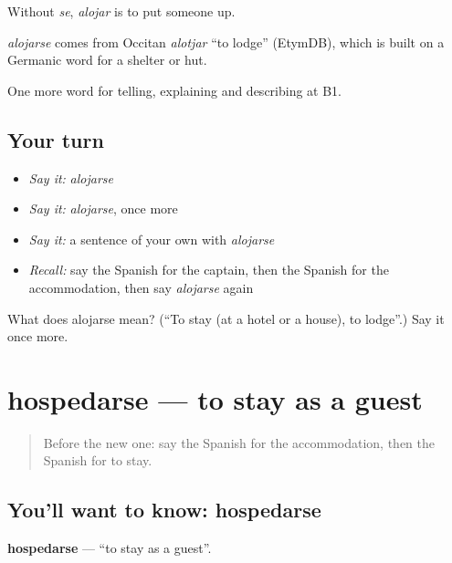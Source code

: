 Without \emph{se}, \emph{alojar} is to put someone up.

\begin{cousinweb}
\emph{alojarse} comes from Occitan \emph{alotjar} \textquotedblleft{}to lodge\textquotedblright{} (EtymDB), which is built on a Germanic word for a shelter or hut.
\end{cousinweb}

\begin{grammarlens}[title={What you've built}]
One more word for telling, explaining and describing at B1.
\end{grammarlens}

\subsection*{Your turn}
\begin{itemize}
\raggedright
  \item \emph{Say it:} \emph{alojarse}
  \item \emph{Say it:} \emph{alojarse}, once more
  \item \emph{Say it:} a sentence of your own with \emph{alojarse}
  \item \emph{Recall:} say the Spanish for the captain, then the Spanish for the accommodation, then say \emph{alojarse} again
\end{itemize}

\begin{tcolorbox}[breakable,colback=teal!4,colframe=teal!35!black,title={Before you move on}]
What does alojarse mean? (\textquotedblleft{}To stay (at a hotel or a house), to lodge\textquotedblright{}.) Say it once more.
\end{tcolorbox}
\section[hospedarse]{hospedarse — to stay as a guest}

\label{lesson:ES-C660-hospedarse}



\begin{quote}
Before the new one: say the Spanish for the accommodation, then the Spanish for to stay.
\end{quote}

\subsection*{You'll want to know: hospedarse}
\textbf{hospedarse} — \textquotedblleft{}to stay as a guest\textquotedblright{}.

